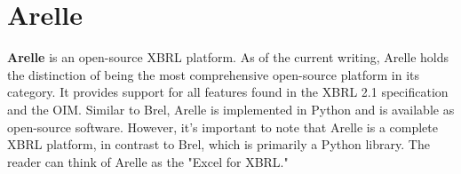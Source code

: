 
\section{Arelle}
\textcolor{tropicalrainforest}{\textbf{Arelle}}\cite{arelle} 
is an open-source XBRL platform. 
As of the current writing, Arelle holds the distinction of being the most comprehensive open-source platform in its category. 
It provides support for all features found in the XBRL 2.1 specification and the OIM. 
Similar to Brel, Arelle is implemented in Python and is available as open-source software. 
However, it's important to note that Arelle is a complete XBRL platform, in contrast to Brel, which is primarily a Python library. 
The reader can think of Arelle as the "Excel for XBRL."



